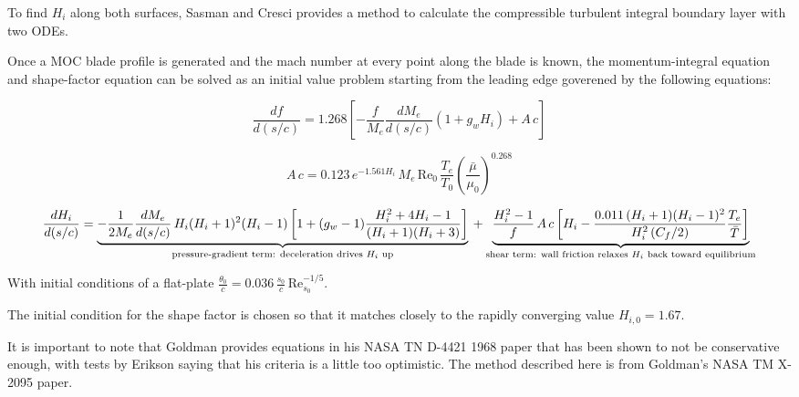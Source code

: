 To find $H_i$ along both surfaces, Sasman and Cresci \cite{sasmancresci} provides a method to calculate the compressible turbulent integral boundary layer with two ODEs. 

Once a MOC blade profile is generated and the mach number at every point along the blade is known, the momentum-integral equation and shape-factor equation can be solved as an initial value problem starting from the leading edge goverened by the following equations:

\begin{equation}
    \frac{df}{d(s/c)} = 1.268\left[-\frac{f}{M_e}\frac{dM_e}{d(s/c)}\left(1 + g_w H_i\right) + A\,c\right]
\end{equation}

\begin{equation}
    A\,c = 0.123\,e^{-1.561 H_i}\, M_e\, \mathrm{Re}_0\, \frac{T_e}{T_0}\left(\frac{\bar\mu}{\mu_0}\right)^{0.268}
\end{equation}

\begin{equation}
\frac{dH_i}{d(s/c)} = \underbrace{-\frac{1}{2M_e}\frac{dM_e}{d(s/c)}\,H_i(H_i+1)^2(H_i-1)\left[1 + (g_w-1)\frac{H_i^2+4H_i-1}{(H_i+1)(H_i+3)}\right]}_{\text{pressure-gradient term: deceleration drives } H_i \text{ up}} \\ + \underbrace{\frac{H_i^2-1}{f}\,A\,c\left[H_i - \frac{0.011\,(H_i+1)(H_i-1)^2}{H_i^2\,(C_f/2)}\frac{T_e}{\bar T}\right]}_{\text{shear term: wall friction relaxes } H_i \text{ back toward equilibrium}}
\end{equation}

With initial conditions of a flat-plate $\frac{\theta_0}{c} = 0.036\,\frac{s_0}{c}\,\mathrm{Re}_{s_0}^{-1/5}$. 

The initial condition for the shape factor is chosen so that it matches closely to the rapidly converging value $ H_{i,0} = 1.67$. 

It is important to note that Goldman provides equations in his NASA TN D-4421 1968 paper that has been shown to not be conservative enough, with tests by Erikson saying that his criteria is a little too optimistic. The method described here is from Goldman's NASA TM X-2095 paper.


